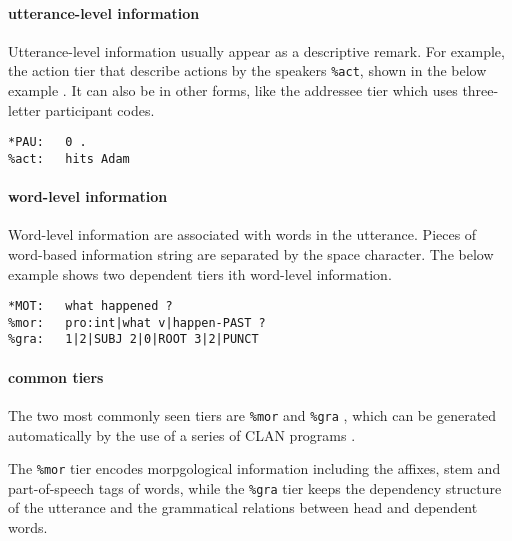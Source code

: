 \paragraph{utterance-level information}
Utterance-level information usually appear as a descriptive remark. For example, the action tier that describe actions by the speakers \texttt{\%act}, shown in the below example . It can also be in other forms, like the addressee tier which uses three-letter participant codes.\\

\lstset{
numbers = none,
frame = single,
}

\begin{lstlisting}[caption={Example of a dependent tier with utterance-level information.}, label={lst:chatsent1}]
*PAU:	0 .
%act:	hits Adam
\end{lstlisting}


\paragraph{word-level information}
Word-level information are associated with words in the utterance. Pieces of word-based information string are separated by the space character. The below example  shows two dependent tiers ith word-level information.\\

\lstset{
numbers = none,
frame = single,
}

\begin{lstlisting}[caption={Example of dependent tiers ith word-level information}, label={lst:chatsent2}]
*MOT:	what happened ?
%mor:	pro:int|what v|happen-PAST ?
%gra:	1|2|SUBJ 2|0|ROOT 3|2|PUNCT
\end{lstlisting}

\paragraph{common tiers}
The two most commonly seen tiers are \texttt{\%mor} and \texttt{\%gra} , which can be generated automatically by the use of a series of CLAN programs .

The \texttt{\%mor} tier encodes morpgological information including the affixes, stem and part-of-speech tags of words, while the \texttt{\%gra} tier keeps the dependency structure of the utterance and the grammatical relations between head and dependent words.\\

